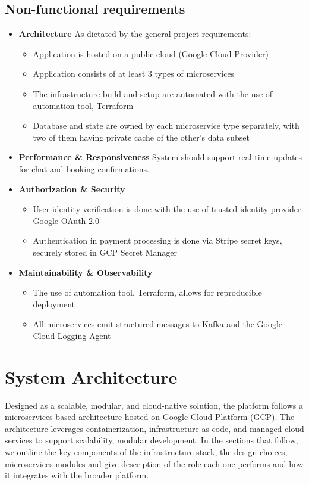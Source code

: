 \documentclass[11pt,a4paper]{article}
\begin{document}
\subsection{Non-functional requirements}
\begin{itemize}
  \item \textbf{Architecture}
    As dictated by the general project requirements:
    \begin{itemize}
      \item Application is hosted on a public cloud (Google Cloud Provider)
      \item Application consists of at least 3 types of microservices
      \item The infrastructure build and setup are automated with the
        use of automation tool, Terraform
      \item Database and state are owned by each microservice type
        separately, with two of them having private cache of the
        other's data subset
    \end{itemize}
  \item \textbf{Performance \& Responsiveness}
    System should support real-time updates for chat and booking confirmations.
  \item \textbf{Authorization \& Security}
    \begin{itemize}
      \item User identity verification is done with the use of
        trusted identity provider Google OAuth 2.0
      \item Authentication in payment processing is done via Stripe
        secret keys, securely stored in GCP Secret Manager
    \end{itemize}
  \item \textbf{Maintainability \& Observability}
    \begin{itemize}
      \item The use of automation tool, Terraform, allows for
        reproducible deployment
      \item All microservices emit structured messages to Kafka and
        the Google Cloud Logging Agent
    \end{itemize}
\end{itemize}

\section{System Architecture}
Designed as a scalable, modular, and cloud-native solution, the
platform follows a microservices-based architecture hosted on Google
Cloud Platform (GCP).
The architecture leverages containerization, infrastructure-as-code,
and managed cloud services to support scalability, modular development.
In the sections that follow, we outline the key components of the
infrastructure stack, the design choices, microservices modules and
give description of the role each one performs and how it integrates
with the broader platform.
\end{document}
